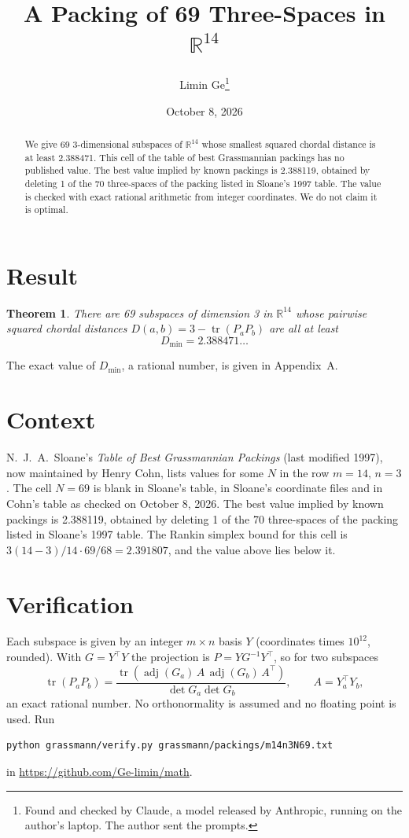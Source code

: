 \documentclass[11pt,a4paper]{article}
\title{A Packing of 69 Three-Spaces in $\mathbb{R}^{14}$}
\author{Limin Ge\thanks{Found and checked by Claude, a model released by Anthropic, running on the author's laptop. The author sent the prompts.}}
\date{October 8, 2026}
\newtheorem*{theorem}{Theorem}
\begin{document}
\maketitle
\begin{abstract}
We give 69 3-dimensional subspaces of $\mathbb{R}^{14}$ whose smallest squared chordal distance is at least 2.388471. This cell of the table of best Grassmannian packings has no published value. The best value implied by known packings is 2.388119, obtained by deleting 1 of the 70 three-spaces of the packing listed in Sloane's 1997 table. The value is checked with exact rational arithmetic from integer coordinates. We do not claim it is optimal.
\end{abstract}

\section{Result}
\begin{theorem}
There are 69 subspaces of dimension 3 in $\mathbb{R}^{14}$ whose pairwise squared chordal distances $D(a,b) = 3 - \operatorname{tr}(P_aP_b)$ are all at least
\[ D_{\min} = 2.388471\ldots \]
\end{theorem}
The exact value of $D_{\min}$, a rational number, is given in Appendix~A.


\section{Context}
N.~J.~A.~Sloane's \emph{Table of Best Grassmannian Packings} (last modified 1997), now maintained by Henry Cohn, lists values for some $N$ in the row $m=14$, $n=3$. The cell $N=69$ is blank in Sloane's table, in Sloane's coordinate files and in Cohn's table as checked on October 8, 2026. The best value implied by known packings is 2.388119, obtained by deleting 1 of the 70 three-spaces of the packing listed in Sloane's 1997 table. The Rankin simplex bound for this cell is $3(14-3)/14\cdot 69/68 = 2.391807$, and the value above lies below it.


\section{Verification}
Each subspace is given by an integer $m\times n$ basis $Y$ (coordinates times $10^{12}$, rounded). With $G=Y^\top Y$ the projection is $P=YG^{-1}Y^\top$, so for two subspaces
\[ \operatorname{tr}(P_aP_b)=\frac{\operatorname{tr}(\operatorname{adj}(G_a)\,A\,\operatorname{adj}(G_b)\,A^\top)}{\det G_a\det G_b},\qquad A=Y_a^\top Y_b, \]
an exact rational number. No orthonormality is assumed and no floating point is used. Run
\begin{verbatim}
python grassmann/verify.py grassmann/packings/m14n3N69.txt
\end{verbatim}
in \url{https://github.com/Ge-limin/math}.
\end{document}
